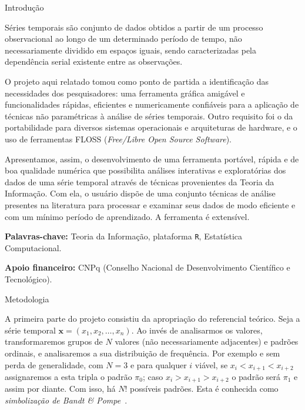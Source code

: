 \documentclass[final]{beamer}
\newlength{\onecolwid}
\begin{document}
\begin{frame}[t] 
\begin{columns}[t] 
\begin{column}{\onecolwid} 

\begin{block}{Introdução}
\small

\quad Séries temporais são conjunto de dados obtidos a partir de um processo observacional ao longo de um determinado período de tempo, não necessariamente dividido em espaços iguais, sendo caracterizadas pela dependência serial existente entre as observações.\newline

O projeto aqui relatado tomou como ponto de partida a identificação das necessidades dos pesquisadores: uma ferramenta gráfica amigável e funcionalidades rápidas, eficientes e numericamente confiáveis para a aplicação de técnicas não paramétricas à análise de séries temporais.
Outro requisito foi o da portabilidade para diversos sistemas operacionais e arquiteturas de hardware, e o uso de ferramentas FLOSS (\textit{Free/Libre Open Source Software}).\newline
 
Apresentamos, assim, o desenvolvimento de uma ferramenta portável, rápida e de boa qualidade numérica que possibilita análises interativas e exploratórias dos dados de uma série temporal através de técnicas provenientes da Teoria da Informação.
Com ela, o usuário dispõe de uma conjunto técnicas de análise presentes na literatura para processar e examinar seus dados de modo eficiente e com um mínimo período de aprendizado.
A ferramenta é extensível.\newline

\textbf{Palavras-chave:} Teoria da Informação, plataforma \texttt R, Estatística Computacional.\newline

\textbf{Apoio financeiro:} CNPq (Conselho Nacional de Desenvolvimento Científico e Tecnológico).
\end{block}
          
\begin{block}{Metodologia}
\small

\quad A primeira parte do projeto consistiu da apropriação do referencial teórico.
Seja a série temporal $\bm x = (x_1, x_2, \dots, x_n)$.
Ao invés de analisarmos os valores, transformaremos grupos de $N$ valores (não necessariamente adjacentes) e padrões ordinais, e analisaremos a sua distribuição de frequência.
Por exemplo e sem perda de generalidade, com $N=3$ e para qualquer $i$ viável,
se $x_i<x_{i+1}<x_{i+2}$ assignaremos a esta tripla o padrão $\pi_0$;
caso $x_i>x_{i+1}>x_{i+2}$ o padrão será $\pi_1$ e assim por diante.
Com isso, há $N!$ possíveis padrões.
Esta é conhecida como \textit{simbolização de Bandt \& Pompe}~\cite{PermutationEntropyBandtPompe}.\newline


\end{block}
\end{column}
\end{columns}
\end{frame}
\end{document}
